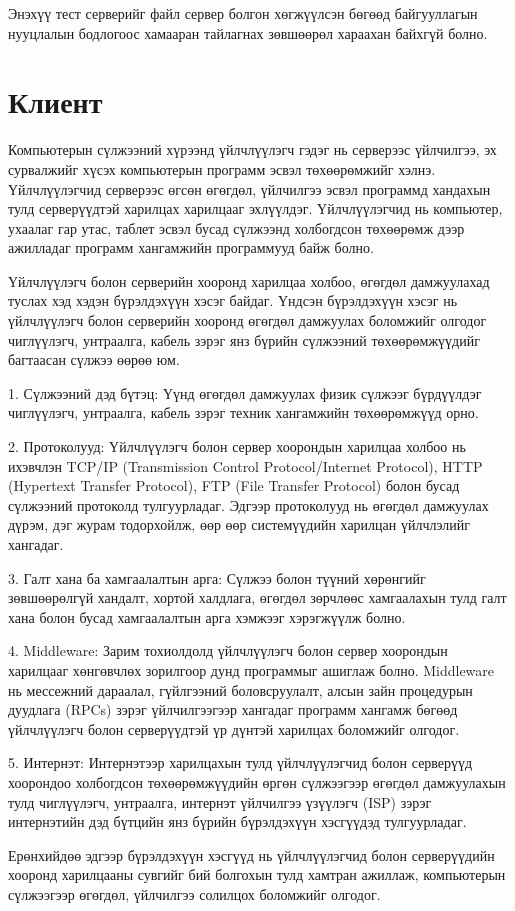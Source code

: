 Энэхүү тест серверийг файл сервер болгон хөгжүүлсэн бөгөөд байгууллагын нууцлалын бодлогоос хамааран тайлагнах зөвшөөрөл хараахан байхгүй болно.
\pagebreak
\section{Клиент}
Компьютерын сүлжээний хүрээнд үйлчлүүлэгч гэдэг нь серверээс үйлчилгээ, эх сурвалжийг хүсэх компьютерын программ эсвэл төхөөрөмжийг хэлнэ. Үйлчлүүлэгчид серверээс өгсөн өгөгдөл, үйлчилгээ эсвэл программд хандахын тулд серверүүдтэй харилцах харилцааг эхлүүлдэг. Үйлчлүүлэгчид нь компьютер, ухаалаг гар утас, таблет эсвэл бусад сүлжээнд холбогдсон төхөөрөмж дээр ажилладаг программ хангамжийн программууд байж болно.

Үйлчлүүлэгч болон серверийн хооронд харилцаа холбоо, өгөгдөл дамжуулахад туслах хэд хэдэн бүрэлдэхүүн хэсэг байдаг. Үндсэн бүрэлдэхүүн хэсэг нь үйлчлүүлэгч болон серверийн хооронд өгөгдөл дамжуулах боломжийг олгодог чиглүүлэгч, унтраалга, кабель зэрэг янз бүрийн сүлжээний төхөөрөмжүүдийг багтаасан сүлжээ өөрөө юм.

1. Сүлжээний дэд бүтэц: Үүнд өгөгдөл дамжуулах физик сүлжээг бүрдүүлдэг чиглүүлэгч, унтраалга, кабель зэрэг техник хангамжийн төхөөрөмжүүд орно.

2. Протоколууд: Үйлчлүүлэгч болон сервер хоорондын харилцаа холбоо нь ихэвчлэн TCP/IP (Transmission Control Protocol/Internet Protocol), HTTP (Hypertext Transfer Protocol), FTP (File Transfer Protocol) болон бусад сүлжээний протоколд тулгуурладаг. Эдгээр протоколууд нь өгөгдөл дамжуулах дүрэм, дэг журам тодорхойлж, өөр өөр системүүдийн харилцан үйлчлэлийг хангадаг.

3. Галт хана ба хамгаалалтын арга: Сүлжээ болон түүний хөрөнгийг зөвшөөрөлгүй хандалт, хортой халдлага, өгөгдөл зөрчлөөс хамгаалахын тулд галт хана болон бусад хамгаалалтын арга хэмжээг хэрэгжүүлж болно.

4. Middleware: Зарим тохиолдолд үйлчлүүлэгч болон сервер хоорондын харилцааг хөнгөвчлөх зорилгоор дунд программыг ашиглаж болно. Middleware нь мессежний дараалал, гүйлгээний боловсруулалт, алсын зайн процедурын дуудлага (RPCs) зэрэг үйлчилгээгээр хангадаг программ хангамж бөгөөд үйлчлүүлэгч болон серверүүдтэй үр дүнтэй харилцах боломжийг олгодог.

5. Интернэт: Интернэтээр харилцахын тулд үйлчлүүлэгчид болон серверүүд хоорондоо холбогдсон төхөөрөмжүүдийн өргөн сүлжээгээр өгөгдөл дамжуулахын тулд чиглүүлэгч, унтраалга, интернэт үйлчилгээ үзүүлэгч (ISP) зэрэг интернэтийн дэд бүтцийн янз бүрийн бүрэлдэхүүн хэсгүүдэд тулгуурладаг.

Ерөнхийдөө эдгээр бүрэлдэхүүн хэсгүүд нь үйлчлүүлэгчид болон серверүүдийн хооронд харилцааны сувгийг бий болгохын тулд хамтран ажиллаж, компьютерын сүлжээгээр өгөгдөл, үйлчилгээ солилцох боломжийг олгодог.
\pagebreak